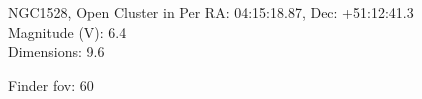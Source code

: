 \begin{block}{NGC1528, Open Cluster in Per}
    RA: 04:15:18.87, Dec: +51:12:41.3 \\ 
    Magnitude (V): 6.4 \\ 
    Dimensions: 9.6 

    Finder fov: 60 
\end{block}